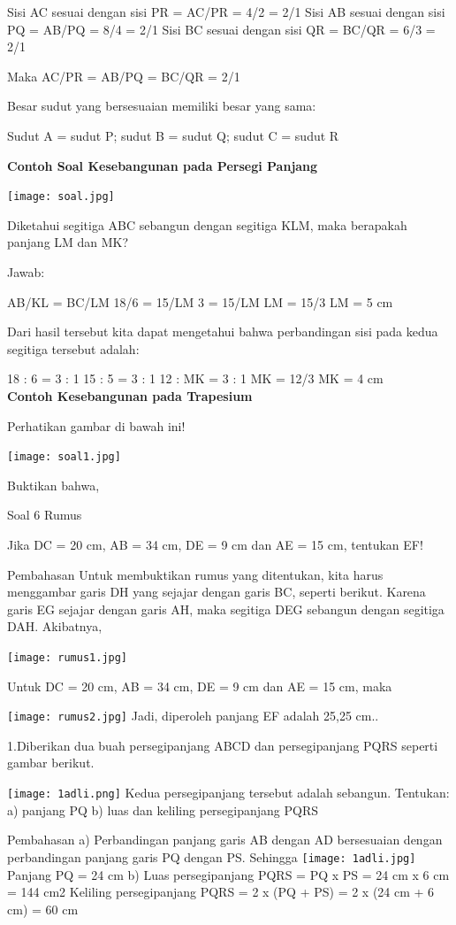 \documentclass[11pt,fleqn]{book} %
\begin{document}
Sisi AC sesuai dengan sisi PR = AC/PR = 4/2 = 2/1
Sisi AB sesuai dengan sisi PQ = AB/PQ = 8/4 = 2/1
Sisi BC sesuai dengan sisi QR = BC/QR = 6/3 = 2/1

Maka AC/PR = AB/PQ = BC/QR = 2/1


Besar sudut yang bersesuaian memiliki besar yang sama:

Sudut A = sudut P; sudut B = sudut Q; sudut C = sudut R

\textbf{Contoh Soal Kesebangunan pada Persegi Panjang}


\texttt{[image: soal.jpg]}


Diketahui segitiga ABC sebangun dengan segitiga KLM, maka berapakah panjang LM dan MK?

Jawab:

AB/KL = BC/LM
18/6  = 15/LM
   3  = 15/LM
   LM = 15/3
   LM = 5 cm

Dari hasil tersebut kita dapat mengetahui bahwa perbandingan sisi pada kedua segitiga tersebut adalah:

18 : 6 = 3 : 1
15 : 5 = 3 : 1
12 : MK = 3 : 1
MK = 12/3
MK = 4 cm
\\

\textbf{Contoh Kesebangunan pada Trapesium}

Perhatikan gambar di bawah ini!

\texttt{[image: soal1.jpg]}

Buktikan bahwa,

Soal 6 Rumus

Jika DC = 20 cm, AB = 34 cm, DE = 9 cm dan AE = 15 cm, tentukan EF!

Pembahasan Untuk membuktikan rumus yang ditentukan, kita harus menggambar garis DH yang sejajar dengan garis BC, seperti berikut.
Karena garis EG sejajar dengan garis AH, maka segitiga DEG sebangun dengan segitiga DAH. Akibatnya,

\texttt{[image: rumus1.jpg]}

Untuk DC = 20 cm, AB = 34 cm, DE = 9 cm dan AE = 15 cm, maka

\texttt{[image: rumus2.jpg]}
Jadi, diperoleh panjang EF adalah 25,25 cm..

1.Diberikan dua buah persegipanjang ABCD dan persegipanjang PQRS seperti gambar berikut.

\texttt{[image: 1adli.png]}
Kedua persegipanjang tersebut adalah sebangun. Tentukan:
a) panjang PQ
b) luas dan keliling persegipanjang PQRS

Pembahasan
a) Perbandingan panjang garis AB dengan AD bersesuaian dengan perbandingan panjang garis PQ dengan PS. Sehingga
\texttt{[image: 1adli.jpg]}
Panjang PQ = 24 cm
b) Luas persegipanjang PQRS = PQ x PS = 24 cm x 6 cm = 144 cm2
Keliling persegipanjang PQRS = 2 x (PQ + PS) = 2 x (24 cm + 6 cm) = 60 cm
\end{document}
